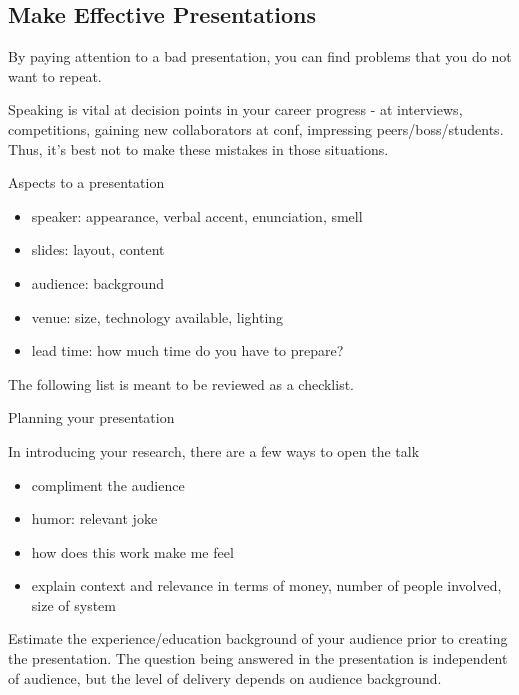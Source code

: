 \subsection{Make Effective Presentations\label{sec:presentations}}


By paying attention to a bad presentation, you can find problems that you do not want to repeat.

Speaking is vital at decision points in your career progress - at interviews, competitions, gaining new collaborators at conf, impressing peers/boss/students. Thus, it's best not to make these mistakes in those situations.

Aspects to a presentation
\begin{itemize}
    \item speaker: appearance, verbal accent, enunciation, smell
    \item slides: layout, content
    \item audience: background
    \item venue: size, technology available, lighting
    \item lead time: how much time do you have to prepare?
\end{itemize}
The following list is meant to be reviewed as a checklist.

Planning your presentation

In introducing your research, there are a few ways to open the talk
\begin{itemize}
    \item compliment the audience
    \item humor: relevant joke
    \item how does this work make me feel
    \item explain context and relevance in terms of money, number of people involved, size of system
\end{itemize}
Estimate the experience/education background of your audience prior to creating the presentation. The question being answered in the presentation is independent of audience, but the level of delivery depends on audience background.


